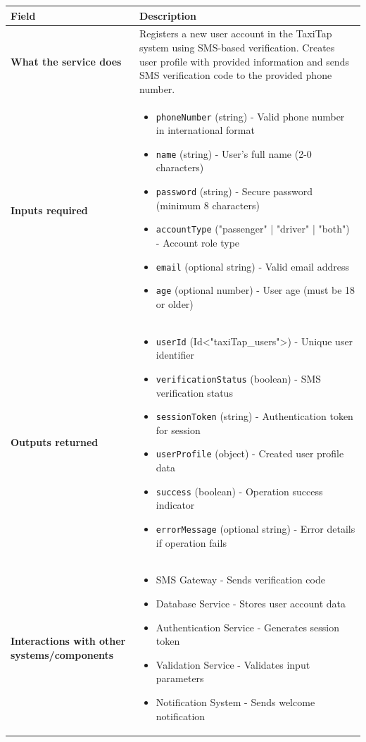 \documentclass[11pt,a4paper]{article}
\begin{document}
\begin{longtable}{|p{4cm}|p{12cm}|}
\hline
\textbf{Field} & \textbf{Description} \\
\hline
\textbf{What the service does} & 
Registers a new user account in the TaxiTap system using SMS-based verification. Creates user profile with provided information and sends SMS verification code to the provided phone number. \\
\hline
\textbf{Inputs required} & 
\begin{itemize}[nosep]
\item \texttt{phoneNumber} (string) - Valid phone number in international format
\item \texttt{name} (string) - User's full name (2-0 characters)
\item \texttt{password} (string) - Secure password (minimum 8 characters)
\item \texttt{accountType} ("passenger" | "driver" | "both") - Account role type
\item \texttt{email} (optional string) - Valid email address
\item \texttt{age} (optional number) - User age (must be 18 or older)
\end{itemize} \\
\hline
\textbf{Outputs returned} & 
\begin{itemize}[nosep]
\item \texttt{userId} (Id<"taxiTap\_users">) - Unique user identifier
\item \texttt{verificationStatus} (boolean) - SMS verification status
\item \texttt{sessionToken} (string) - Authentication token for session
\item \texttt{userProfile} (object) - Created user profile data
\item \texttt{success} (boolean) - Operation success indicator
\item \texttt{errorMessage} (optional string) - Error details if operation fails
\end{itemize} \\
\hline
\textbf{Interactions with other systems/components   } & 
\begin{itemize}[nosep]
\item SMS Gateway - Sends verification code
\item Database Service - Stores user account data
\item Authentication Service - Generates session token
\item Validation Service - Validates input parameters
\item Notification System - Sends welcome notification
\end{itemize} \\
\hline
\end{longtable}
\end{document}
